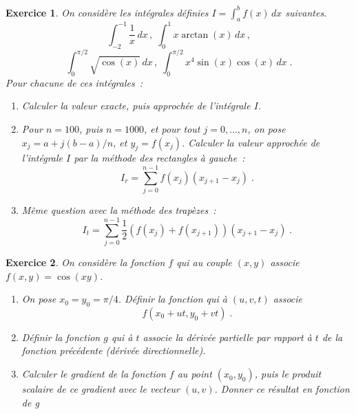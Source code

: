 \documentclass{article}
\newtheorem{exo}{Exercice}[section]
\begin{document}
\begin{exo}{\rm
On consid\`ere les int\'egrales d\'efinies $I=\int_a^b f(x)\,dx$
suivantes.
$$
\int_{-2}^{-1}\frac{1}{x}\,dx\,,\;
\int_0^1 x\arctan(x)\,dx\,,
$$
$$
\int_0^{\pi/2} \sqrt{\cos(x)}\,dx\,,\;
\int_0^{\pi/2} x^4\sin(x)\cos(x)\,dx\;.
$$ 
Pour chacune de ces int\'egrales~:
\begin{enumerate}
\item
Calculer la valeur exacte, puis approch\'ee de l'int\'egrale $I$.
\item
Pour $n=100$, puis $n=1000$, et 
pour tout $j=0,\ldots,n$, on pose $x_j=a+j(b-a)/n$, et $y_j=f(x_j)$.
Calculer la valeur approch\'ee de l'int\'egrale $I$ par la 
m\'ethode des rectangles \`a gauche~:
$$
I_r = \sum_{j=0}^{n-1} f(x_j)(x_{j+1}-x_j)\;.
$$
\item
M\^eme question avec la m\'ethode des trap\`ezes~:
$$
I_t = \sum_{j=0}^{n-1} \frac{1}{2}(f(x_j)+f(x_{j+1}))(x_{j+1}-x_j)\;.
$$
\end{enumerate}
}\end{exo}
\begin{exo}{\rm
On consid\`ere la fonction $f$ qui au couple $(x,y)$ associe
$f(x,y)=\cos(xy)$.
\begin{enumerate}
\item
On pose $x_0=y_0=\pi/4$. D\'efinir la fonction qui \`a $(u,v,t)$
associe 
$$f(x_0+ut,y_0+vt)\;.$$ 
\item
D\'efinir la fonction $g$ qui \`a $t$ associe la d\'eriv\'ee partielle par
rapport \`a $t$ de la fonction pr\'ec\'edente (d\'eriv\'ee
directionnelle).
\item
Calculer le gradient de la fonction $f$ au point $(x_0,y_0)$, puis le
produit scalaire de ce gradient avec le vecteur $(u,v)$. 
Donner ce r\'esultat en fonction de g
\end{enumerate}
}\end{exo}
\end{document}
